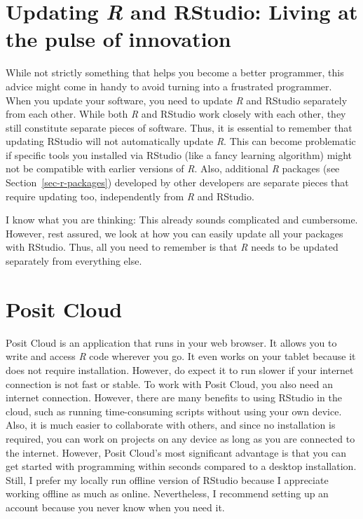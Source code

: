 \documentclass[
  letterpaper,
  DIV=11,
  numbers=noendperiod]{scrreprt}
\begin{document}
\section{\texorpdfstring{Updating \emph{R} and RStudio: Living at the
pulse of
innovation}{Updating R and RStudio: Living at the pulse of innovation}}\label{sec-updating-r-and-rstudio}

While not strictly something that helps you become a better programmer,
this advice might come in handy to avoid turning into a frustrated
programmer. When you update your software, you need to update \emph{R}
and RStudio separately from each other. While both \emph{R} and RStudio
work closely with each other, they still constitute separate pieces of
software. Thus, it is essential to remember that updating RStudio will
not automatically update \emph{R}. This can become problematic if
specific tools you installed via RStudio (like a fancy learning
algorithm) might not be compatible with earlier versions of \emph{R}.
Also, additional \emph{R} packages (see Section~\ref{sec-r-packages})
developed by other developers are separate pieces that require updating
too, independently from \emph{R} and RStudio.

I know what you are thinking: This already sounds complicated and
cumbersome. However, rest assured, we look at how you can easily update
all your packages with RStudio. Thus, all you need to remember is that
\emph{R} needs to be updated separately from everything else.

\section{Posit Cloud}\label{sec-rstudio-cloud}

Posit Cloud is an application that runs in your web browser. It allows
you to write and access \emph{R} code wherever you go. It even works on
your tablet because it does not require installation. However, do expect
it to run slower if your internet connection is not fast or stable. To
work with Posit Cloud, you also need an internet connection. However,
there are many benefits to using RStudio in the cloud, such as running
time-consuming scripts without using your own device. Also, it is much
easier to collaborate with others, and since no installation is
required, you can work on projects on any device as long as you are
connected to the internet. However, Posit Cloud's most significant
advantage is that you can get started with programming within seconds
compared to a desktop installation. Still, I prefer my locally run
offline version of RStudio because I appreciate working offline as much
as online. Nevertheless, I recommend setting up an account because you
never know when you need it.
\end{document}
